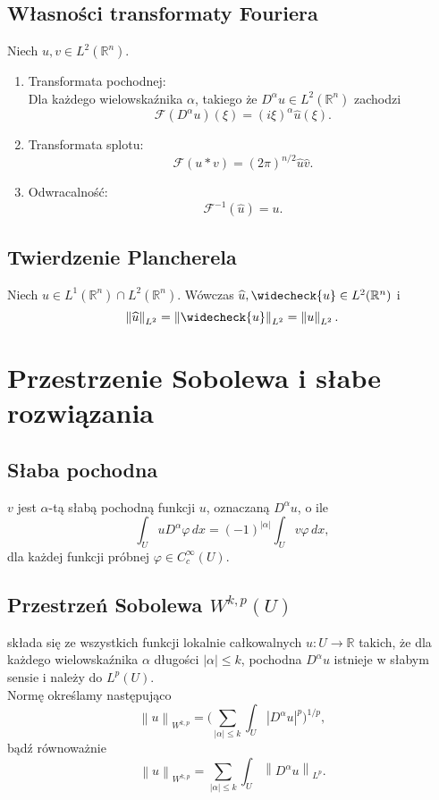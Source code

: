 \documentclass[letterpaper,12pt]{article}
\newcommand{\norm}[1]{\left\lVert#1\right\rVert}
\newcommand{\R}{\mathbb{R}}
\newcommand{\F}{\mathcal{F}}
\renewcommand{\leq}{\leqslant}
\begin{document}
\subsection{Własności transformaty Fouriera}
Niech $u, v \in L^2(\R^n)$.
\begin{enumerate}
    \item Transformata pochodnej:\\
          Dla każdego wielowskaźnika $\alpha$, takiego że $D^\alpha u \in L^2(\R^n)$ zachodzi
          $$ \F(D^\alpha u)(\xi) = (i\xi)^\alpha \widehat{u}(\xi).$$
    \item Transformata splotu:
          $$\F(u * v) = (2\pi)^{n/2}\widehat{u}\widehat{v}.$$
    \item Odwracalność:
          $$\F^{-1}(\widehat{u}) = u.$$
\end{enumerate}

\subsection{Twierdzenie Plancherela}
Niech $u \in L^1(\R^n) \cap L^2(\R^n)$. Wówczas $\widehat{u}, \widecheck{u} \in L^2(\R^n)$ i
$$ \norm{\widehat{u}}_{L^2} = \norm{\widecheck{u}}_{L^2} = \norm{u}_{L^2}. $$

\section{Przestrzenie Sobolewa i słabe rozwiązania}

\subsection{Słaba pochodna}
$v$ jest $\alpha$-tą słabą pochodną funkcji $u$, oznaczaną $D^\alpha u$, o ile
$$ \int_U u D^\alpha \varphi \, dx = (-1)^{|\alpha|} \int_U v \varphi \, dx, $$
dla każdej funkcji próbnej $\varphi \in C^\infty_c(U)$.

\subsection{Przestrzeń Sobolewa $W^{k,p}(U)$}
składa się ze wszystkich funkcji lokalnie całkowalnych $u: U \to \R$ takich, że dla każdego wielowskaźnika $\alpha$ długości $|\alpha| \leq k$, pochodna $D^\alpha u$ istnieje w słabym sensie i należy do $L^p (U)$.\\

\noindent
Normę określamy następująco
$$ \norm{u}_{W^{k,p}} = \big( \sum_{|\alpha| \leq k} \int_U |D^\alpha u|^p \big)^{1/p},$$
bądź równoważnie
$$ \norm{u}_{W^{k,p}} = \sum_{|\alpha| \leq k} \int_U \norm{D^\alpha u}_{L^p}.$$
\end{document}
